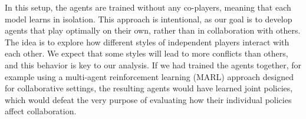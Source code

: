 \begin{flushleft}
\begin{flushleft}
        In this setup, the agents are trained without any co-players, meaning that each model learns in isolation. This approach is intentional, as our goal is to develop agents that play optimally on their own, rather than in collaboration with others. The idea is to explore how different styles of independent players interact with each other. We expect that some styles will lead to more conflicts than others, and this behavior is key to our analysis. If we had trained the agents together, for example using a multi-agent reinforcement learning (MARL) approach designed for collaborative settings, the resulting agents would have learned joint policies, which would defeat the very purpose of evaluating how their individual  policies affect collaboration.\\~\\


\end{flushleft}
\end{flushleft}
